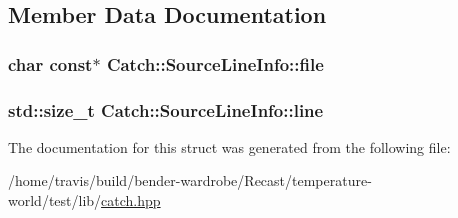 \subsection{Member Data Documentation}
\hypertarget{struct_catch_1_1_source_line_info_ad65537703e9f08c1fa7777fbc3f0c617}{
\subsubsection[{file}]{\setlength{\rightskip}{0pt plus 5cm}char const$\ast$ Catch\-::\-Source\-Line\-Info\-::file}}\label{struct_catch_1_1_source_line_info_ad65537703e9f08c1fa7777fbc3f0c617}
\hypertarget{struct_catch_1_1_source_line_info_a841e5d696c7b9cde24e45e61dd979c77}{
\subsubsection[{line}]{\setlength{\rightskip}{0pt plus 5cm}std\-::size\-\_\-t Catch\-::\-Source\-Line\-Info\-::line}}\label{struct_catch_1_1_source_line_info_a841e5d696c7b9cde24e45e61dd979c77}


The documentation for this struct was generated from the following file\-:\begin{DoxyCompactItemize}
\item 
/home/travis/build/bender-\/wardrobe/\-Recast/temperature-\/world/test/lib/\hyperlink{catch_8hpp}{catch.\-hpp}\end{DoxyCompactItemize}
